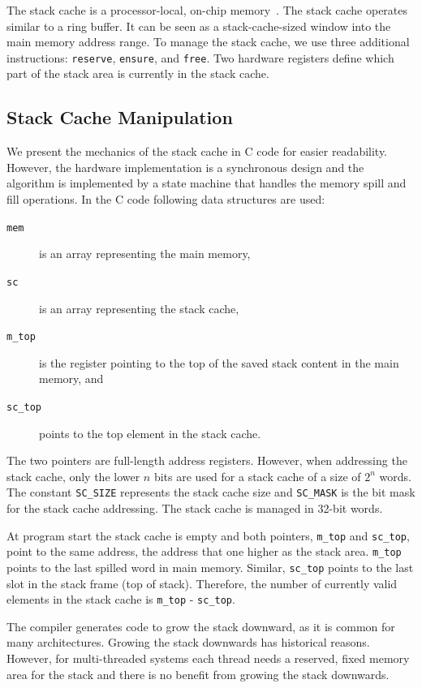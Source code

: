\documentclass[a4paper,fontsize=10pt,twoside,DIV15,BCOR12mm,headinclude=true,footinclude=false,pagesize,bibtotoc]{scrbook}
\newcommand{\code}[1]{{\texttt{#1}}}
\begin{document}
The stack cache is a processor-local, on-chip memory~\cite{patmos:stack:seus}. The stack
cache operates similar to a ring buffer. It can be seen as a stack-cache-sized
window into the main memory address range.
To manage the stack cache, we use three additional
instructions: \code{reserve}, \code{ensure},
and \code{free}. Two hardware registers define which
part of the stack area is currently in the stack cache.

\subsection{Stack Cache Manipulation}

We present the mechanics of the stack cache in C code for easier readability.
However, the hardware implementation is a synchronous design and
the algorithm is implemented by a state machine that handles
the memory spill and fill operations. In the C code following data structures are used:

\begin{description}
\item[\code{mem}] is an array representing the main memory,
\item[\code{sc}] is an array representing the stack cache,
\item[\code{m\_top}] is the register pointing to the top of the saved stack content in the main memory, and
\item[\code{sc\_top}] points to the top element in the stack cache.
\end{description}

The two pointers are full-length address registers. However,
when addressing the stack cache, only the lower $n$ bits
are used for a stack cache of a size of $2^n$ words.
The constant \code{SC\_SIZE} represents the stack
cache size and \code{SC\_MASK} is the bit mask for
the stack cache addressing. The stack cache is managed in 32-bit
words. %

At program start the stack cache is empty and both pointers,
\code{m\_top} and \code{sc\_top}, point to the same address,
the address that one higher as the stack area. \code{m\_top}
points to the last spilled word in main memory.
Similar, \code{sc\_top} points to the last slot in the stack
frame (top of stack). Therefore, the number of currently valid
elements in the stack cache is \code{m\_top} - \code{sc\_top}.

The compiler generates code to grow the stack downward,
as it is common for many architectures. Growing the stack downwards
has historical reasons. However, for multi-threaded
systems each thread needs a reserved, fixed memory area
for the stack and there is no benefit from growing the stack
downwards.
\end{document}
